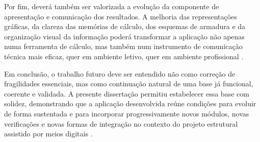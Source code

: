 Por fim, deverá também ser valorizada a evolução da componente de apresentação e comunicação dos resultados. A melhoria das representações gráficas, da clareza das memórias de cálculo, dos esquemas de armadura e da organização visual da informação poderá transformar a aplicação não apenas numa ferramenta de cálculo, mas também num instrumento de comunicação técnica mais eficaz, quer em ambiente letivo, quer em ambiente profissional \cite{DaileySVG,TikZManual,TikZGoncalves}.

Em conclusão, o trabalho futuro deve ser entendido não como correção de fragilidades essenciais, mas como continuação natural de uma base já funcional, coerente e validada. A presente dissertação permitiu estabelecer essa base com solidez, demonstrando que a aplicação desenvolvida reúne condições para evoluir de forma sustentada e para incorporar progressivamente novos módulos, novas verificações e novas formas de integração no contexto do projeto estrutural assistido por meios digitais \cite{EN1992,Structrun,DjangoDocs}.